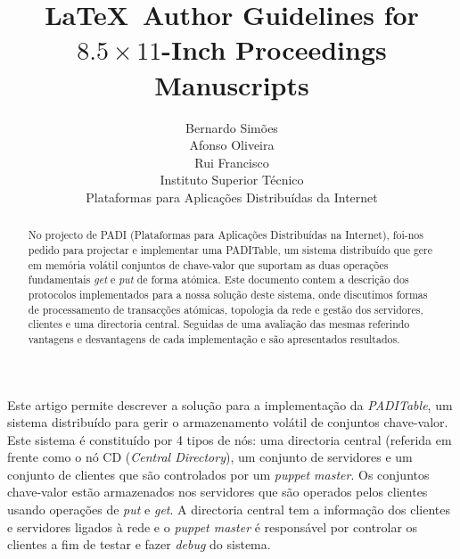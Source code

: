 \documentclass[times, 10pt,twocolumn]{article}
\begin{document}
\title{\LaTeX\ Author Guidelines 
       for {\boldmath $8.5 \times 11$-Inch} Proceedings Manuscripts}

\author{Bernardo Simões\\ Afonso Oliveira\\ Rui Francisco\\
Instituto Superior Técnico\\Plataformas para Aplicações Distribuídas da Internet\\
}

\maketitle
\thispagestyle{empty}

\begin{abstract}
No projecto de PADI (Plataformas para Aplicações Distribuídas na Internet), foi-nos pedido para projectar e implementar uma PADITable, um sistema distribuído que gere em memória volátil conjuntos de chave-valor que suportam as duas operações fundamentais \emph{get} e \emph{put} de forma atómica.
Este documento contem a descrição dos protocolos implementados para a nossa solução deste sistema, onde discutimos formas de processamento de transacções atómicas, topologia da rede e gestão dos servidores, clientes e uma directoria central. Seguidas de uma avaliação das mesmas referindo vantagens e desvantagens de cada implementação e são apresentados resultados.
\end{abstract}




Este artigo permite descrever a solução para a implementação da \emph{PADITable}, um sistema distribuído para gerir o armazenamento volátil de conjuntos chave-valor. Este sistema é constituído por 4 tipos de nós: uma directoria central (referida em frente como o nó CD (\emph{Central Directory}), um conjunto de servidores e um conjunto de clientes que são controlados por um \emph{puppet master}. Os conjuntos chave-valor estão armazenados nos servidores que são operados pelos clientes usando operações de \emph{put} e \emph{get}. A directoria central tem a informação dos clientes e servidores ligados à rede e o \emph{puppet master} é responsável por controlar os clientes a fim de testar e fazer \emph{debug} do sistema.
\end{document}
